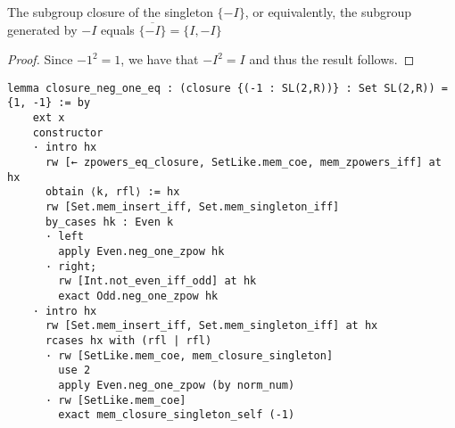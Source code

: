 \begin{corollary}
\label{SpecialSubgroups.closure_neg_one_eq}
\leanok
The subgroup closure of the singleton $\{-I\}$, or equivalently, the subgroup generated by $-I$ equals $\overline{\{-I\}} = \{I, -I\}$
\end{corollary}
\begin{proof}
\leanok
Since $-1^2 = 1$, we have that $-I^2 = I$ and thus the result follows.
\end{proof}
\begin{footnotesize}
\begin{verbatim}
lemma closure_neg_one_eq : (closure {(-1 : SL(2,R))} : Set SL(2,R)) = {1, -1} := by
    ext x
    constructor
    · intro hx
      rw [← zpowers_eq_closure, SetLike.mem_coe, mem_zpowers_iff] at hx
      obtain ⟨k, rfl⟩ := hx
      rw [Set.mem_insert_iff, Set.mem_singleton_iff]
      by_cases hk : Even k
      · left
        apply Even.neg_one_zpow hk
      · right;
        rw [Int.not_even_iff_odd] at hk
        exact Odd.neg_one_zpow hk
    · intro hx
      rw [Set.mem_insert_iff, Set.mem_singleton_iff] at hx
      rcases hx with (rfl | rfl)
      · rw [SetLike.mem_coe, mem_closure_singleton]
        use 2
        apply Even.neg_one_zpow (by norm_num)
      · rw [SetLike.mem_coe]
        exact mem_closure_singleton_self (-1)
\end{verbatim}
\end{footnotesize}


